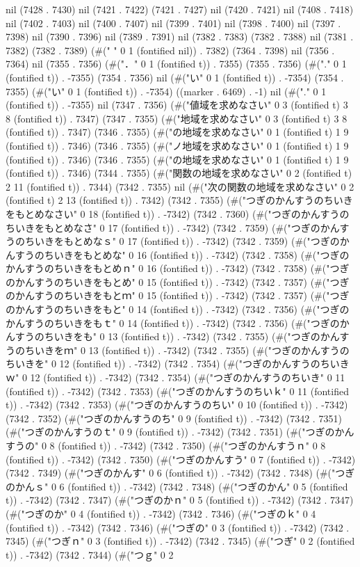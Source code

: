 nil (7428 . 7430) nil (7421 . 7422) (7421 . 7427) nil (7420 . 7421) nil (7408 . 7418) nil (7402 . 7403) nil (7400 . 7407) nil (7399 . 7401) nil (7398 . 7400) nil (7397 . 7398) nil (7390 . 7396) nil (7389 . 7391) nil (7382 . 7383) (7382 . 7388) nil (7381 . 7382) (7382 . 7389) (#("	" 0 1 (fontified nil)) . 7382) (7364 . 7398) nil (7356 . 7364) nil (7355 . 7356) (#("．" 0 1 (fontified t)) . 7355) (7355 . 7356) (#("." 0 1 (fontified t)) . -7355) (7354 . 7356) nil (#("い" 0 1 (fontified t)) . -7354) (7354 . 7355) (#("い" 0 1 (fontified t)) . -7354) ((marker . 6469) . -1) nil (#("." 0 1 (fontified t)) . -7355) nil (7347 . 7356) (#("値域を求めなさい" 0 3 (fontified t) 3 8 (fontified t)) . 7347) (7347 . 7355) (#("地域を求めなさい" 0 3 (fontified t) 3 8 (fontified t)) . 7347) (7346 . 7355) (#("の地域を求めなさい" 0 1 (fontified t) 1 9 (fontified t)) . 7346) (7346 . 7355) (#("ノ地域を求めなさい" 0 1 (fontified t) 1 9 (fontified t)) . 7346) (7346 . 7355) (#("の地域を求めなさい" 0 1 (fontified t) 1 9 (fontified t)) . 7346) (7344 . 7355) (#("関数の地域を求めなさい" 0 2 (fontified t) 2 11 (fontified t)) . 7344) (7342 . 7355) nil (#("次の関数の地域を求めなさい" 0 2 (fontified t) 2 13 (fontified t)) . 7342) (7342 . 7355) (#("つぎのかんすうのちいきをもとめなさい" 0 18 (fontified t)) . -7342) (7342 . 7360) (#("つぎのかんすうのちいきをもとめなさ" 0 17 (fontified t)) . -7342) (7342 . 7359) (#("つぎのかんすうのちいきをもとめなｓ" 0 17 (fontified t)) . -7342) (7342 . 7359) (#("つぎのかんすうのちいきをもとめな" 0 16 (fontified t)) . -7342) (7342 . 7358) (#("つぎのかんすうのちいきをもとめｎ" 0 16 (fontified t)) . -7342) (7342 . 7358) (#("つぎのかんすうのちいきをもとめ" 0 15 (fontified t)) . -7342) (7342 . 7357) (#("つぎのかんすうのちいきをもとｍ" 0 15 (fontified t)) . -7342) (7342 . 7357) (#("つぎのかんすうのちいきをもと" 0 14 (fontified t)) . -7342) (7342 . 7356) (#("つぎのかんすうのちいきをもｔ" 0 14 (fontified t)) . -7342) (7342 . 7356) (#("つぎのかんすうのちいきをも" 0 13 (fontified t)) . -7342) (7342 . 7355) (#("つぎのかんすうのちいきをｍ" 0 13 (fontified t)) . -7342) (7342 . 7355) (#("つぎのかんすうのちいきを" 0 12 (fontified t)) . -7342) (7342 . 7354) (#("つぎのかんすうのちいきｗ" 0 12 (fontified t)) . -7342) (7342 . 7354) (#("つぎのかんすうのちいき" 0 11 (fontified t)) . -7342) (7342 . 7353) (#("つぎのかんすうのちいｋ" 0 11 (fontified t)) . -7342) (7342 . 7353) (#("つぎのかんすうのちい" 0 10 (fontified t)) . -7342) (7342 . 7352) (#("つぎのかんすうのち" 0 9 (fontified t)) . -7342) (7342 . 7351) (#("つぎのかんすうのｔ" 0 9 (fontified t)) . -7342) (7342 . 7351) (#("つぎのかんすうの" 0 8 (fontified t)) . -7342) (7342 . 7350) (#("つぎのかんすうｎ" 0 8 (fontified t)) . -7342) (7342 . 7350) (#("つぎのかんすう" 0 7 (fontified t)) . -7342) (7342 . 7349) (#("つぎのかんす" 0 6 (fontified t)) . -7342) (7342 . 7348) (#("つぎのかんｓ" 0 6 (fontified t)) . -7342) (7342 . 7348) (#("つぎのかん" 0 5 (fontified t)) . -7342) (7342 . 7347) (#("つぎのかｎ" 0 5 (fontified t)) . -7342) (7342 . 7347) (#("つぎのか" 0 4 (fontified t)) . -7342) (7342 . 7346) (#("つぎのｋ" 0 4 (fontified t)) . -7342) (7342 . 7346) (#("つぎの" 0 3 (fontified t)) . -7342) (7342 . 7345) (#("つぎｎ" 0 3 (fontified t)) . -7342) (7342 . 7345) (#("つぎ" 0 2 (fontified t)) . -7342) (7342 . 7344) (#("つｇ" 0 2 